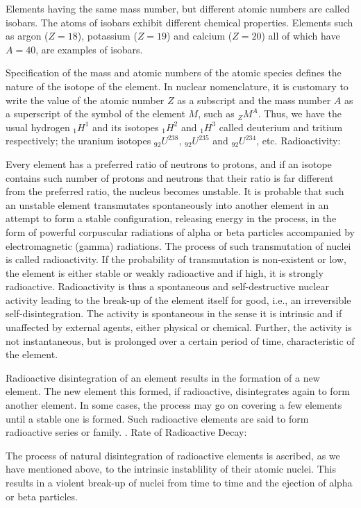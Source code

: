 Elements having the same mass number, but different atomic numbers are called isobars.
The atoms of isobars exhibit different chemical properties.
Elements such as argon ($Z=18$), potassium ($Z=19$) and calcium ($Z=20$) all of which have $A=40$, are examples of isobars.
 
Specification of the mass and atomic numbers of the atomic species defines the nature of the isotope of the element.
In nuclear nomenclature, it is customary to write the value of the atomic number $Z$ as a subscript and the mass number $A$ as a superscript of the symbol of the element $M$, such as $_ZM^A$.
Thus, we have the usual hydrogen $_1H^1$ and its isotopes $_1H^2$ and $_1H^3$ called deuterium and tritium respectively; the uranium isotopes $_{92}U^{238}$, $_{92}U^{235}$ and $_{92}U^{234}$, etc.
\bigskip
\noindent
{\sc Radioactivity:}
 
Every element has a preferred ratio of neutrons to protons, and if an isotope contains such number of protons and neutrons that their ratio is far different from the preferred ratio, the nucleus becomes unstable.
It is probable that such an unstable element transmutates spontaneously into another element in an attempt to form a stable configuration, releasing energy in the process, in the form of powerful corpuscular radiations of alpha or beta particles accompanied by electromagnetic (gamma) radiations.
The process of such transmutation of nuclei is called radioactivity.
If the probability of transmutation is non-existent or low, the element is either stable or weakly radioactive and if high, it is strongly radioactive.
Radioactivity is thus a spontaneous and self-destructive nuclear activity leading to the break-up of the element itself for good, i.e., an irreversible self-disintegration.
The activity is spontaneous in the sense it is intrinsic and if unaffected by external agents, either physical or chemical.
Further, the activity is not instantaneous, but is prolonged over a certain period of time, characteristic of the element.
 
Radioactive disintegration of an element results in the formation of a new element.
The new element this formed, if radioactive, disintegrates again to form another element.
In some cases, the process may go on covering a few elements until a stable one is formed.
Such radioactive elements are said to form radioactive series or family.
\bigskip
\noindent
{. Rate of Radioactive Decay:}
 
The process of natural disintegration of radioactive elements is ascribed, as we have mentioned above, to the intrinsic instablility of their atomic nuclei.
This results in a violent break-up of nuclei from time to time and the ejection of alpha or beta particles.
 
